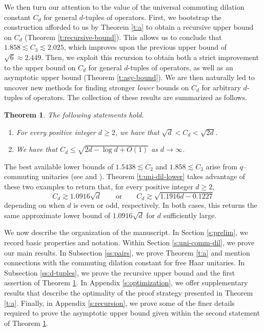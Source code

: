 \documentclass[10pt]{amsart}
\newtheorem{theoremx}{Theorem}
\begin{document}
We then turn our attention to the value of the universal commuting dilation constant $C_d$ for general $d$-tuples of operators. First, we bootstrap the construction afforded to us by Theorem \ref{t:a} to obtain a recursive upper bound on $C_d$ (Theorem \ref{t:recursive-bound}). This allows us to conclude that $1.858\lesssim C_3\lesssim 2.025$, which improves upon the previous upper bound of $\sqrt{6}\approx 2.449$. Then, we exploit this recursion to obtain both a strict improvement to the upper bound on $C_d$ for general $d$-tuples of operators, as well as an asymptotic upper bound (Theorem \ref{t:asy-bound}). We are then naturally led to uncover new methods for finding stronger \emph{lower} bounds on $C_d$ for arbitrary $d$-tuples of operators. The collection of these results are summarized as follows.

\begin{theoremx}\label{t:b}
    The following statements hold.
    \begin{enumerate}[{\rm (i)}]
        \item For every positive integer $d\geq 2$, we have that $\sqrt{d}< C_d<\sqrt{2d}$.
        \item We have that $C_d \leq \sqrt{2d-\log d + O(1)}$ as $d\rightarrow\infty$.
    \end{enumerate}
\end{theoremx}

The best available lower bounds of $1.5438\lesssim C_2$ and $1.858\lesssim C_3$ arise from $q$--commuting unitaries (see \cite[Section 7]{gerhold2022dilations} and \cite[Corollary 4.7]{gerhold2021dilations}). Theorem \ref{t:uni-dil-lower} takes advantage of these two examples to return that, for every positive integer $d\geq 2$,
\[
    C_d \gtrsim 1.0916\sqrt{d} \qquad \text{or} \qquad C_d \gtrsim \sqrt{1.1916d - 0.1227}
\]
depending on when $d$ is even or odd, respectively. In both cases, this returns the same approximate lower bound of $1.0916\sqrt{d}$ for $d$ sufficiently large.

We now describe the organization of the manuscript. In Section \ref{s:prelim}, we record basic properties and notation. Within Section \ref{s:uni-comm-dil}, we prove our main results. In Subsection \ref{ss:pairs}, we prove Theorem \ref{t:a} and mention connections with the commuting dilation constant for free Haar unitaries. In Subsection \ref{ss:d-tuples}, we prove the recursive upper bound and the first assertion of Theorem \ref{t:b}. In Appendix \ref{s:optimization}, we offer supplementary results that describe the optimality of the proof strategy presented in Theorem \ref{t:a}. Finally, in Appendix \ref{s:recursion}, we prove some of the finer details required to prove the asymptotic upper bound given within the second statement of Theorem \ref{t:b}.
\end{document}
